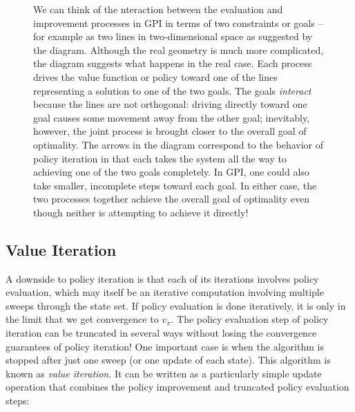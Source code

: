 \documentclass[12pt]{article}
\begin{document}
\begin{figure}[h]
  \centering
  \caption{\footnotesize We can think of the nteraction between the evaluation and improvement processes in GPI in terms of two constraints or goals -- for example as two lines in two-dimensional space as suggested by the diagram. Although the real geometry is much more complicated, the diagram suggests what happens in the real case. Each process drives the value function or policy toward one of the lines representing a solution to one of the two goals. The goals \emph{interact} because the lines are not orthogonal: driving directly toward one goal causes some movement away from the other goal; inevitably, however, the joint process is brought closer to the overall goal of optimality. The arrows in the diagram correspond to the behavior of policy iteration in that each takes the system all the way to achieving one of the two goals completely. In GPI, one could also take smaller, incomplete steps toward each goal. In either case, the two processes together achieve the overall goal of optimality even though neither is attempting to achieve it directly!}
\end{figure}
\subsection{Value Iteration}
A downside to policy iteration is that each of its iterations involves policy evaluation, which may itself be an iterative computation involving multiple sweeps through the state set. If policy evaluation is done iteratively, it is only in the limit that we get convergence to $v_\pi$. The policy evaluation step of policy iteration can be truncated in several ways without losing the convergence guarantees of policy iteration! One important case is when the algorithm is stopped after just one sweep (or one update of each state). This algorithm is known as \emph{value iteration}. It can be written as a particularly simple update operation that combines the policy improvement and truncated policy evaluation steps:
\end{document}
